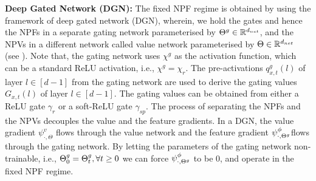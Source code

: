 \textbf{Deep Gated Network (DGN):} The fixed NPF regime is obtained by using the framework of deep gated network (DGN), wherein, we hold the gates and hence the NPFs in a separate gating network parameterised by ${\Theta}^g\in\mathbb{R}^{d_{net}}$, and the NPVs in a different network called value network parameterised by $\Theta\in\mathbb{R}^{d_{net}}$ (see ). Note that, the gating network uses $\chi^g$ as the activation function, which can be a standard ReLU activation, i.e., $\chi^g=\chi_r$. The pre-activations $q^g_{x,t}(l)$ of layer $l\in[d-1]$ from the gating network are used to derive the gating values $G_{x,t}(l)$ of layer $l\in[d-1]$. The gating values can be obtained from either a ReLU gate $\gamma_r$ or a soft-ReLU gate $\gamma_{sp}$. The process of separating the NPFs and the NPVs decouples the value and the feature gradients. In a DGN, the value gradient $\psi^v_{\cdot,\Theta}$ flows through the value network and the feature gradient $\psi^{\phi}_{\cdot,{\Theta}^g}$flows through the gating network. By letting the parameters of the gating network non-trainable, i.e., ${\Theta}^g_0={\Theta}^g_t,\forall t\geq 0$ we can force $\psi^{\phi}_{\cdot,{\Theta}^g}$ to be $0$, and operate in the fixed NPF regime.
